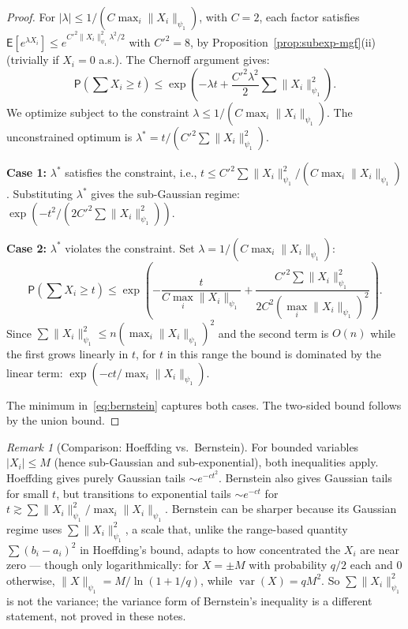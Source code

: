 \documentclass[14pt]{extarticle}
\theoremstyle{plain}
\theoremstyle{definition}
\theoremstyle{remark}
\newtheorem*{remark}{Remark}
\newcommand\expc{\mathsf{E}}
\newcommand\prb{\mathsf{P}}
\DeclareMathOperator\var{var}
\begin{document}
\begin{proof}
For $|\lambda| \leqslant 1/(C\max_i\|X_i\|_{\psi_1})$, with $C = 2$, each factor satisfies $\expc[e^{\lambda X_i}] \leqslant e^{C'^2\|X_i\|_{\psi_1}^2\lambda^2/2}$ with $C'^2 = 8$, by Proposition~\ref{prop:subexp-mgf}(ii) (trivially if $X_i = 0$ a.s.). The Chernoff argument gives:
\[
\prb\!\left(\sum X_i \geqslant t\right) \leqslant \exp\!\left(-\lambda t + \frac{C'^2\lambda^2}{2}\sum\|X_i\|_{\psi_1}^2\right).
\]
We optimize subject to the constraint $\lambda \leqslant 1/(C\max_i\|X_i\|_{\psi_1})$. The unconstrained optimum is $\lambda^* = t/(C'^2\sum\|X_i\|_{\psi_1}^2)$.

\textbf{Case 1:} $\lambda^*$ satisfies the constraint, i.e., $t \leqslant C'^2\sum\|X_i\|_{\psi_1}^2/(C\max_i\|X_i\|_{\psi_1})$. Substituting $\lambda^*$ gives the sub-Gaussian regime: $\exp(-t^2/(2C'^2\sum\|X_i\|_{\psi_1}^2))$.

\textbf{Case 2:} $\lambda^*$ violates the constraint. Set $\lambda = 1/(C\max_i\|X_i\|_{\psi_1})$:
\[
\prb\!\left(\sum X_i \geqslant t\right) \leqslant \exp\!\left(-\frac{t}{C\max_i\|X_i\|_{\psi_1}} + \frac{C'^2\sum\|X_i\|_{\psi_1}^2}{2C^2(\max_i\|X_i\|_{\psi_1})^2}\right).
\]
Since $\sum\|X_i\|_{\psi_1}^2 \leqslant n(\max_i\|X_i\|_{\psi_1})^2$ and the second term is $O(n)$ while the first grows linearly in $t$, for $t$ in this range the bound is dominated by the linear term: $\exp(-ct/\max_i\|X_i\|_{\psi_1})$.

The minimum in~\eqref{eq:bernstein} captures both cases. The two-sided bound follows by the union bound.
\end{proof}

\begin{remark}[Comparison: Hoeffding vs.\ Bernstein]
For bounded variables $|X_i| \leqslant M$ (hence sub-Gaussian and sub-exponential), both inequalities apply. Hoeffding gives purely Gaussian tails $\sim e^{-ct^2}$. Bernstein also gives Gaussian tails for small $t$, but transitions to exponential tails $\sim e^{-ct}$ for $t \gtrsim \sum\|X_i\|_{\psi_1}^2/\max_i\|X_i\|_{\psi_1}$. Bernstein can be sharper because its Gaussian regime uses $\sum\|X_i\|_{\psi_1}^2$, a scale that, unlike the range-based quantity $\sum(b_i - a_i)^2$ in Hoeffding's bound, adapts to how concentrated the $X_i$ are near zero --- though only logarithmically: for $X = \pm M$ with probability $q/2$ each and $0$ otherwise, $\|X\|_{\psi_1} = M/\ln(1 + 1/q)$, while $\var(X) = qM^2$. So $\sum\|X_i\|_{\psi_1}^2$ is not the variance; the variance form of Bernstein's inequality is a different statement, not proved in these notes.
\end{remark}
\end{document}
